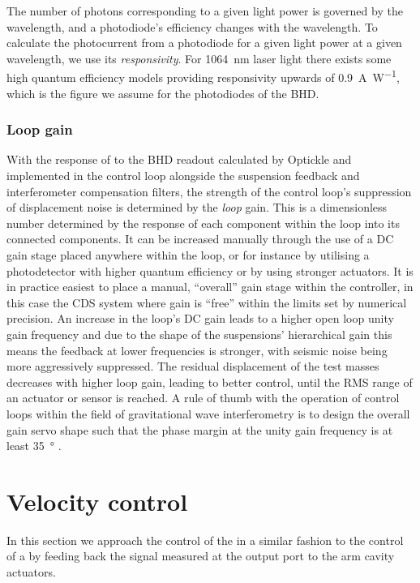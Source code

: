 The number of photons corresponding to a given light power is governed by the wavelength, and a photodiode's efficiency changes with the wavelength. To calculate the photocurrent from a photodiode for a given light power at a given wavelength, we use its \emph{responsivity}. For \SI{1064}{\nano\meter} laser light there exists some high quantum efficiency models providing responsivity upwards of \SI{0.9}{\ampere\per\watt}, which is the figure we assume for the photodiodes of the \gls{BHD}.

\subsubsection{Loop gain}
With the response of \LMINUS{} to the \gls{BHD} readout calculated by Optickle and implemented in the control loop alongside the suspension feedback and interferometer compensation filters, the strength of the control loop's suppression of displacement noise is determined by the \emph{loop} gain. This is a dimensionless number determined by the response of each component within the loop into its connected components. It can be increased manually through the use of a \gls{DC} gain stage placed anywhere within the loop, or for instance by utilising a photodetector with higher quantum efficiency or by using stronger actuators. It is in practice easiest to place a manual, ``overall'' gain stage within the controller, in this case the \gls{CDS} system where gain is ``free'' within the limits set by numerical precision. An increase in the loop's \gls{DC} gain leads to a higher open loop unity gain frequency and due to the shape of the suspensions' hierarchical gain this means the feedback at lower frequencies is stronger, with seismic noise being more aggressively suppressed. The residual displacement of the test masses decreases with higher loop gain, leading to better control, until the \gls{RMS} range of an actuator or sensor is reached. A rule of thumb with the operation of control loops within the field of gravitational wave interferometry is to design the overall gain servo shape such that the phase margin at the unity gain frequency is at least \SI{35}{\degree} \cite{Freise2003}.

\section{\label{sec:velocity-control}Velocity control}
In this section we approach the control of the \SSM{} in a similar fashion to the control of a \MI{} by feeding back the signal measured at the output port to the arm cavity actuators.

